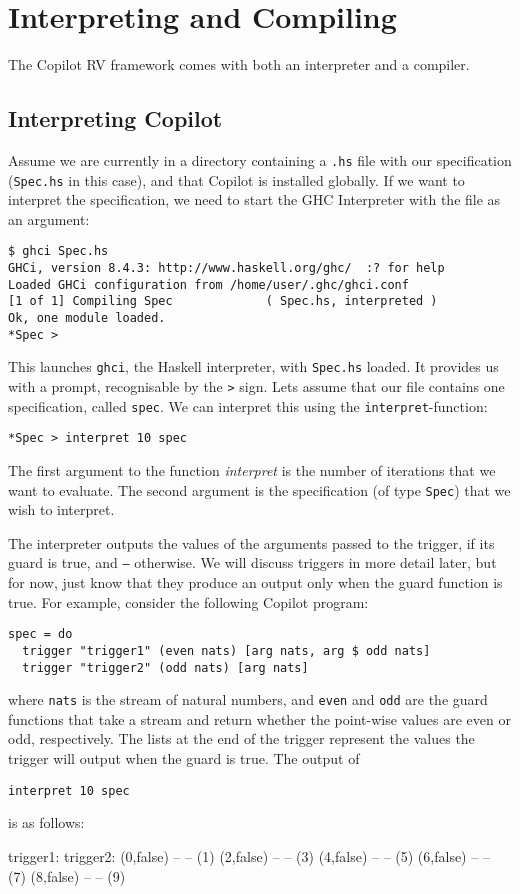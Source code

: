 \newpage 
\section{Interpreting and Compiling}
\label{interpcompile}
The Copilot RV framework comes with both an interpreter and a
compiler. 
\subsection{Interpreting Copilot}
Assume we are currently in a directory containing a \texttt{.hs} file with our
specification (\texttt{Spec.hs} in this case), and that Copilot is installed
globally. If we want to interpret the specification, we need to start the GHC
Interpreter with the file as an argument:
%
\begin{lstlisting}
$ ghci Spec.hs
GHCi, version 8.4.3: http://www.haskell.org/ghc/  :? for help
Loaded GHCi configuration from /home/user/.ghc/ghci.conf
[1 of 1] Compiling Spec             ( Spec.hs, interpreted )
Ok, one module loaded.
*Spec > 
\end{lstlisting}
%
This launches \texttt{ghci}, the Haskell interpreter, with \texttt{Spec.hs}
loaded. It provides us with a prompt, recognisable by the \texttt{>} sign. Lets
assume that our file contains one specification, called \texttt{spec}. We can
interpret this using the \texttt{interpret}-function:
\begin{lstlisting}[language = Copilot]
*Spec > interpret 10 spec
\end{lstlisting}
%
The first argument to the function \emph{interpret} is the number of iterations
that we want to evaluate. The second argument is the specification (of type
{\tt Spec}) that we wish to interpret.

The interpreter outputs the values of the arguments passed to the trigger, if
its guard is true, and {\tt --} otherwise. We will discuss triggers in more
detail later, but for now, just know that they produce an output only when the
guard function is true. For example, consider the following Copilot program:
%
\begin{lstlisting}[language = Copilot]
spec = do
  trigger "trigger1" (even nats) [arg nats, arg $ odd nats]
  trigger "trigger2" (odd nats) [arg nats]
\end{lstlisting}
where {\tt nats} is the stream of natural numbers, and {\tt even} and {\tt odd}
are the guard functions that take a stream and return whether the point-wise
values are even or odd, respectively. The lists at the end of the trigger
represent the values the trigger will output when the guard is true. The output
of
%
\begin{lstlisting}[language = Copilot]
interpret 10 spec
\end{lstlisting}
is as follows:
%
\begin{code}
trigger1:   trigger2:
(0,false)  --
--         (1)
(2,false)  --
--         (3)
(4,false)  --
--         (5)
(6,false)  --
--         (7)
(8,false)  --
--         (9)
\end{code}
%

